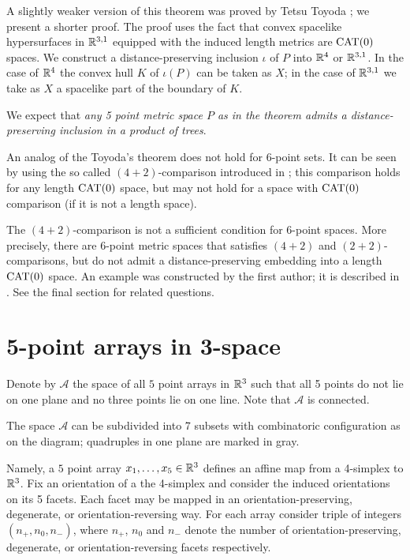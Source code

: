 \documentclass{article}
\begin{document}
A slightly weaker version of this theorem was proved by Tetsu Toyoda \cite{toyoda};
we present a shorter proof.
The proof uses the fact that convex spacelike hypersurfaces in $\mathbb{R}^{3,1}$ equipped with the induced length metrics are $\mathrm{CAT}(0)$ spaces.
We construct a distance-preserving inclusion $\iota$ of $P$ into $\mathbb{R}^4$ or $\mathbb{R}^{3,1}$.
In the case of $\mathbb{R}^4$ the convex hull $K$ of $\iota(P)$ can be taken as $X$;
in the case of $\mathbb{R}^{3,1}$ we take as $X$ a spacelike part of the boundary of $K$.

We expect that \emph{any 5 point metric space $P$ as in the theorem admits a distance-preserving inclusion in a product of trees}.

An analog of the Toyoda's theorem does not hold for 6-point sets.
It can be seen by using the so called $(4{+}2)$-comparison introduced in \cite{alexander-kapovitch-petrunin-2011};
this comparison holds for any length $\mathrm{CAT}(0)$ space, but may not hold for a space with $\mathrm{CAT}(0)$ comparison (if it is not a length space).

{\sloppy

The $(4{+}2)$-comparison is not a sufficient condition for $6$-point spaces.
More precisely, there are 6-point metric spaces that satisfies $(4{+}2)$ and $(2{+}2)$-comparisons, but do not admit a distance-preserving embedding into a length $\mathrm{CAT}(0)$ space.
An example was constructed by the first author; it is described in \cite{alexander-kapovitch-petrunin-2011}.
See the final section for related questions.

}

\section{5-point arrays in 3-space}

Denote by $\mathcal{A}$ the space of all $5$ point arrays in $\mathbb{R}^3$ such that all 5 points do not lie on one plane and no three points lie on one line.
Note that $\mathcal{A}$ is connected.

The space $\mathcal{A}$ can be subdivided into 7 subsets with combinatoric configuration as on the diagram;
quadruples in one plane are marked in gray.

Namely, a $5$ point array  $x_1,\dots,x_5\in \mathbb{R}^3$ defines an affine map from a 4-simplex to $\mathbb{R}^3$.
Fix an orientation of a the 4-simplex and consider the induced orientations on its 5 facets.
Each facet may be mapped in an orientation-preserving, degenerate, or orientation-reversing way.
For each array consider triple of integers $(n_+, n_0,n_-)$,
where $n_+$, $n_0$ and $n_-$ denote the number of orientation-preserving, degenerate, or orientation-reversing facets respectively.
\end{document}
